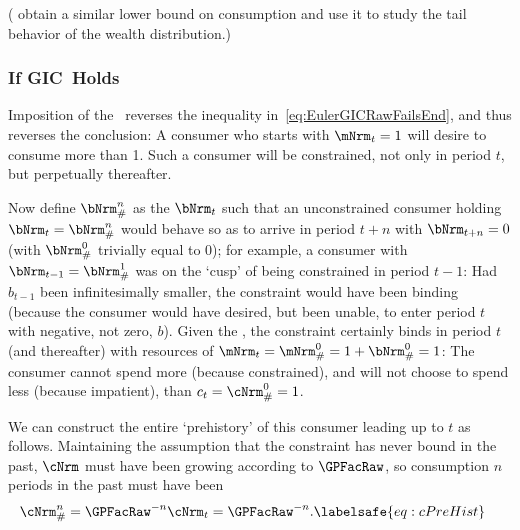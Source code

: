 \documentclass[\econtexRoot/BufferStockTheory]{subfiles}
\begin{document}
(\cite{StachurskiToda2019JET} obtain a similar lower bound on consumption and use it to study the tail behavior of the wealth distribution.)


\subsubsection{If {GIC}~Holds}

Imposition of the \GICRaw~reverses the inequality in~\eqref{eq:EulerGICRawFailsEnd}, and thus reverses the conclusion: A consumer who starts with $\mNrm_{t}=1$ will desire to consume more than 1.
Such a consumer will be constrained, not only in period $t$, but perpetually thereafter.

Now define $\bNrm_{\#}^{n}$ as the $\bNrm_{t}$ such that an unconstrained consumer holding $\bNrm_{t}=\bNrm_{\#}^{n}$ would behave so as to arrive in period $t+n$ with $\bNrm_{t+n}=0$ (with $\bNrm_{\#}^{0}$ trivially equal to 0); for example, a consumer with $\bNrm_{t-1}=\bNrm_{\#}^{1}$ was on the `cusp' of being constrained in period $t-1$: Had $b_{t-1}$ been infinitesimally smaller, the constraint would have been binding (because the consumer would have desired, but been unable, to enter period $t$ with negative, not zero, $b$).
Given
the \GICRaw, the constraint certainly binds in period $t$ (and thereafter) with resources of $\mNrm_{t}=\mNrm_{\#}^{0}=1+\bNrm_{\#}^{0}=1$: The consumer cannot spend more (because constrained), and will not choose to spend less (because impatient), than $c_{t}=\cNrm_{\#}^{0}=1$.

We can construct the entire `prehistory' of this consumer leading up to $t$ as follows.
Maintaining the assumption that the constraint has never bound in the past,
$\cNrm$ must have been growing according to $\GPFacRaw$, so consumption $n$ periods in the past must have been
\begin{equation}\begin{gathered}\begin{aligned}
  \cNrm_{\#}^{n}  & = \GPFacRaw^{-n} \cNrm_{t} = \GPFacRaw^{-n}. \labelsafe{eq:cPreHist}
\end{aligned}\end{gathered}\end{equation}
\end{document}
